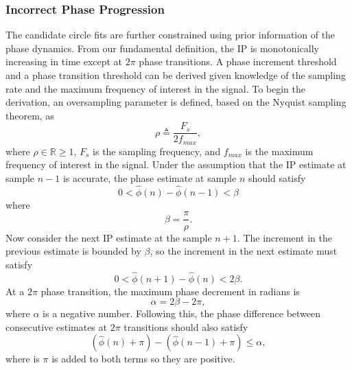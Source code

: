 \documentclass[a4paper]{IEEEtran}
\begin{document}
\subsubsection{Incorrect Phase Progression}
The candidate circle fits are further constrained using prior information of the phase dynamics. From our fundamental definition, the IP is monotonically increasing in time except at $2\pi$ phase transitions. A phase increment threshold and a phase transition threshold can be derived given knowledge of the sampling rate and the maximum frequency of interest in the signal. To begin the derivation, an oversampling parameter is defined, based on the Nyquist sampling theorem, as
\begin{equation}
	\rho\triangleq\frac{F_s}{2f_{max}},
\end{equation}
where $\rho \in \mathbb{R} \ge 1$, $F_s$ is the sampling frequency, and $f_{max}$ is the maximum frequency of interest in the signal. Under the assumption that the IP estimate at sample $n-1$ is accurate, the phase estimate at sample $n$ should satisfy
\begin{equation}
	0 < \hat\phi(n)-\hat\phi(n-1) < \beta
\end{equation}
where 
\begin{equation}
	\beta = \frac{\pi}{\rho}.
\end{equation}
Now consider the next IP estimate at the sample $n+1$. The increment in the previous estimate is bounded by $\beta$, so the increment in the next estimate must satisfy
\begin{equation}\label{eq:Prior1}
	0 < \hat\phi(n+1)-\hat\phi(n) < 2\beta.
\end{equation} 
At a $2\pi$ phase transition, the maximum phase decrement in radians is
\begin{equation}
	\alpha=2\beta-2\pi,
\end{equation}
where $\alpha$ is a negative number. Following this, the phase difference between consecutive estimates at $2\pi$ transitions should also satisfy
\begin{equation}\label{eq:Prior2}
(\hat{\phi} \left( n \right)+\pi) - (\hat{\phi} \left( n-1\right)+\pi) \le \alpha, 
\end{equation}
where is $\pi$ is added to both terms so they are positive.
\end{document}
